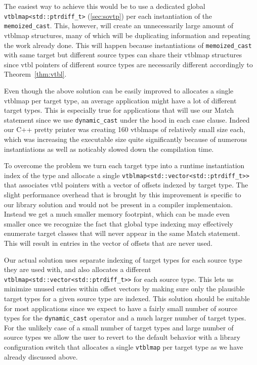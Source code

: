\documentclass[preprint]{sigplanconf}
\makeatletter
\DeclareRobustCommand{\code}[1]{{\lstinline[breaklines=false,escapechar=@]{#1}}}
\makeatother
\begin{document}
The easiest way to achieve this would be to use a dedicated global
\code{vtblmap<std::ptrdiff_t>} (\textsection\ref{sec:sovtp}) per each 
instantiation of the \code{memoized_cast}. This, however, will create an 
unnecessarily large amount of vtblmap structures, many of which will be  
duplicating information and repeating the work already done. This will happen 
because instantiations of \code{memoized_cast} with same target but different 
source types can share their vtblmap structures since vtbl pointers of different 
source types are necessarily different accordingly to Theorem~\ref{thm:vtbl}. 

Even though the above solution can be easily improved to allocates a single 
vtblmap per target type, an average application might have a lot of different 
target types. This is especially true for applications that will use our Match 
statement since we use \code{dynamic_cast} under the hood in each case clause. 
Indeed our C++ pretty printer was creating 160 vtblmaps of relatively small size 
each, which was increasing the executable size quite significantly because of 
numerous instantiations as well as noticably slowed down the compilation time.

To overcome the problem we turn each target type into a runtime instantiation 
index of the type and allocate a single \code{vtblmap<std::vector<std::ptrdiff_t>>} 
that associates vtbl pointers with a vector of offsets indexed by target type. 
The slight performance overhead that is brought by this improvement is specific 
to our library solution and would not be present in a compiler implementaion. 
Instead we get a much smaller memory footrpint, which can be made even smaller 
once we recognize the fact that global type indexing may effectively enumerate 
target classes that will never appear in the same Match statement. This will 
result in entries in the vector of offsets that are never used.

Our actual solution uses separate indexing of target types for each source type 
they are used with, and also allocates a different 
\code{vtblmap<std::vector<std::ptrdiff_t>>} for each source type. This lets us 
minimize unused entries within offset vectors by making sure only the plausible 
target types for a given source type are indexed. This solution should be 
suitable for most applications since we expect to have a fairly small 
number of source types for the \code{dynamic_cast} operator and a much larger number 
of target types. For the unlikely case of a small number of target types and large 
number of source types we allow the user to revert to the default behavior with a 
library configuration switch that allocates a single \code{vtblmap} per target type as 
we have already discussed above.
\end{document}
